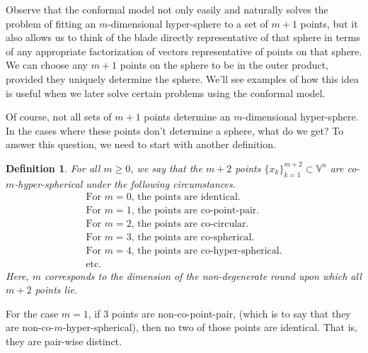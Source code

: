 \documentclass[12pt]{article}
\newcommand{\V}{\mathbb{V}}
\newtheorem{definition}{Definition}[section]
\begin{document}
Observe that the conformal model not only easily and
naturally solves the problem of fitting an $m$-dimensional hyper-sphere
to a set of $m+1$ points, but it also allows us to think of the blade directly
representative of that sphere in terms of any appropriate factorization
of vectors representative of points on that sphere.  We
can choose any $m+1$ points on the sphere to be in the outer product, provided they uniquely
determine the sphere.  We'll see examples of how this idea is
useful when we later solve certain problems using the conformal model.

Of course, not all sets of $m+1$ points determine
an $m$-dimensional hyper-sphere.  In the cases where these points don't determine a sphere, what do
we get?  To answer this question, we need to start with another definition.
\begin{definition}\label{def_co_hyper_spherical}
For all $m\geq 0$, we say that the $m+2$ points $\{x_k\}_{k=1}^{m+2}\subset\V^n$
are co-$m$-hyper-spherical under the following circumstances.
\begin{equation*}
\begin{array}{l}
\mbox{For $m=0$, the points are identical.} \\
\mbox{For $m=1$, the points are co-point-pair.} \\
\mbox{For $m=2$, the points are co-circular.} \\
\mbox{For $m=3$, the points are co-spherical.} \\
\mbox{For $m=4$, the points are co-hyper-spherical.} \\
\mbox{etc.}
\end{array}
\end{equation*}
Here, $m$ corresponds to the dimension of the non-degenerate round upon
which all $m+2$ points lie.
\end{definition}

For the case $m=1$, if 3 points are non-co-point-pair, (which is to say that
they are non-co-$m$-hyper-spherical), then no two of those points are identical.
That is, they are pair-wise distinct.
\end{document}
